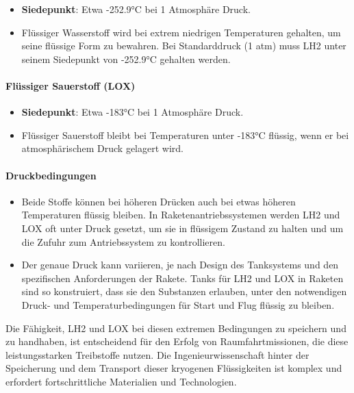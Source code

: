 \documentclass{vorlage-design-main}
\begin{document}
\begin{itemize}

\item
  \textbf{Siedepunkt}: Etwa -252.9°C bei 1 Atmosphäre Druck.
\item
  Flüssiger Wasserstoff wird bei extrem niedrigen Temperaturen gehalten,
  um seine flüssige Form zu bewahren. Bei Standarddruck (1 atm) muss LH2
  unter seinem Siedepunkt von -252.9°C gehalten werden.
\end{itemize}

\hypertarget{fluxfcssiger-sauerstoff-lox}{%
\paragraph{Flüssiger Sauerstoff
(LOX)}\label{fluessiger-sauerstoff-lox}}

\begin{itemize}

\item
  \textbf{Siedepunkt}: Etwa -183°C bei 1 Atmosphäre Druck.
\item
  Flüssiger Sauerstoff bleibt bei Temperaturen unter -183°C flüssig,
  wenn er bei atmosphärischem Druck gelagert wird.
\end{itemize}

\hypertarget{druckbedingungen}{%
\paragraph{Druckbedingungen}\label{druckbedingungen}}

\begin{itemize}

\item
  Beide Stoffe können bei höheren Drücken auch bei etwas höheren
  Temperaturen flüssig bleiben. In Raketenantriebssystemen werden LH2
  und LOX oft unter Druck gesetzt, um sie in flüssigem Zustand zu halten
  und um die Zufuhr zum Antriebssystem zu kontrollieren.
\item
  Der genaue Druck kann variieren, je nach Design des Tanksystems und
  den spezifischen Anforderungen der Rakete. Tanks für LH2 und LOX in
  Raketen sind so konstruiert, dass sie den Substanzen erlauben, unter
  den notwendigen Druck- und Temperaturbedingungen für Start und Flug
  flüssig zu bleiben.
\end{itemize}

Die Fähigkeit, LH2 und LOX bei diesen extremen Bedingungen zu speichern
und zu handhaben, ist entscheidend für den Erfolg von
Raumfahrtmissionen, die diese leistungsstarken Treibstoffe nutzen. Die
Ingenieurwissenschaft hinter der Speicherung und dem Transport dieser
kryogenen Flüssigkeiten ist komplex und erfordert fortschrittliche
Materialien und Technologien.
\end{document}
